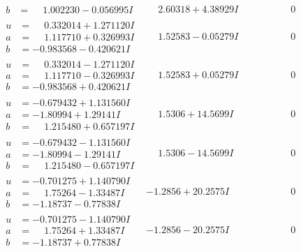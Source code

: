 \documentclass[1p]{elsarticle_modified}
\theoremstyle{definition}
\begin{document}
$$\begin{array}{c|c|c}
\begin{aligned}
b &= \phantom{-}1.002230 - 0.056995 I\end{aligned}
 & \phantom{-}2.60318 + 4.38929 I & \phantom{-0.000000 } 0 \\ \hline\begin{aligned}
u &= \phantom{-}0.332014 + 1.271120 I \\
a &= \phantom{-}1.117710 + 0.326993 I \\
b &= -0.983568 - 0.420621 I\end{aligned}
 & \phantom{-}1.52583 - 0.05279 I & \phantom{-0.000000 } 0 \\ \hline\begin{aligned}
u &= \phantom{-}0.332014 - 1.271120 I \\
a &= \phantom{-}1.117710 - 0.326993 I \\
b &= -0.983568 + 0.420621 I\end{aligned}
 & \phantom{-}1.52583 + 0.05279 I & \phantom{-0.000000 } 0 \\ \hline\begin{aligned}
u &= -0.679432 + 1.131560 I \\
a &= -1.80994 + 1.29141 I \\
b &= \phantom{-}1.215480 + 0.657197 I\end{aligned}
 & \phantom{-}1.5306 + 14.5699 I & \phantom{-0.000000 } 0 \\ \hline\begin{aligned}
u &= -0.679432 - 1.131560 I \\
a &= -1.80994 - 1.29141 I \\
b &= \phantom{-}1.215480 - 0.657197 I\end{aligned}
 & \phantom{-}1.5306 - 14.5699 I & \phantom{-0.000000 } 0 \\ \hline\begin{aligned}
u &= -0.701275 + 1.140790 I \\
a &= \phantom{-}1.75264 - 1.33487 I \\
b &= -1.18737 - 0.77838 I\end{aligned}
 & -1.2856 + 20.2575 I & \phantom{-0.000000 } 0 \\ \hline\begin{aligned}
u &= -0.701275 - 1.140790 I \\
a &= \phantom{-}1.75264 + 1.33487 I \\
b &= -1.18737 + 0.77838 I\end{aligned}
 & -1.2856 - 20.2575 I & \phantom{-0.000000 } 0 \\ \hline\begin{aligned}

\end{aligned}
\end{array}$$
\end{document}
